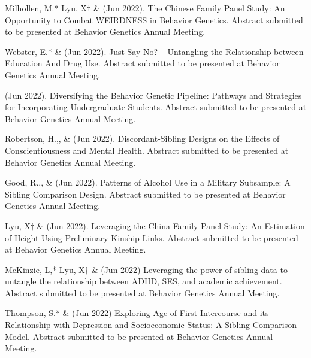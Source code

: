 
\item Milhollen, M.* Lyu, X$\dagger$ \&  \meb (Jun 2022). The Chinese Family Panel Study: An Opportunity to Combat WEIRDNESS in Behavior Genetics. Abstract submitted to be presented at Behavior Genetics Annual Meeting.

\item Webster, E.*  \& \meb (Jun 2022). Just Say No? – Untangling the Relationship between Education And Drug Use. Abstract submitted to be presented at Behavior Genetics Annual Meeting.

\item \meb (Jun 2022). Diversifying the Behavior Genetic Pipeline: Pathways and Strategies for Incorporating Undergraduate Students. Abstract submitted to be presented at Behavior Genetics Annual Meeting.

\item Robertson, H.,\noteA \jdt, \Joe \&  \meb (Jun 2022). Discordant-Sibling Designs on the Effects of Conscientiousness and Mental Health. Abstract submitted to be presented at Behavior Genetics Annual Meeting.

\item Good, R.,\noteA \yrh, \&  \meb (Jun 2022). Patterns of Alcohol Use in a Military Subsample: A Sibling Comparison Design. Abstract submitted to be presented at Behavior Genetics Annual Meeting.

\item Lyu, X$\dagger$ \&  \meb (Jun 2022). Leveraging the China Family Panel Study: An Estimation of Height Using Preliminary Kinship Links. Abstract submitted to be presented at Behavior Genetics Annual Meeting.

\item McKinzie, L,* Lyu, X$\dagger$ \& \meb (Jun 2022) Leveraging the power of sibling data to untangle the relationship between ADHD, SES, and academic achievement. Abstract submitted to be presented at Behavior Genetics Annual Meeting.
%

\item Thompson, S.* \& \meb (Jun 2022) Exploring Age of First Intercourse and its Relationship with Depression and Socioeconomic Status: A Sibling Comparison Model.  Abstract submitted to be presented at Behavior Genetics Annual Meeting.
%

%

%

%

%
